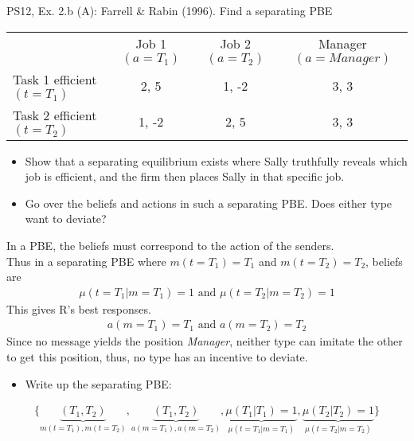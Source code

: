 \begin{frame}{PS12, Ex. 2.b (A): Farrell \& Rabin (1996). Find a separating PBE}
    \begin{table}
      \begin{tabular}{l|c|c|c|}
          \multicolumn{1}{c}{} & \multicolumn{1}{c}{Job 1 $(a=T_1)$} & \multicolumn{1}{c}{Job 2 $(a=T_2)$} & \multicolumn{1}{c}{Manager $(a=Manager)$} \\\cline{2-4}
           Task 1 efficient $(t=T_1)$ & 2, 5 & 1, -2 & 3, 3 \\\cline{2-4}
           Task 2 efficient $(t=T_2)$ & 1, -2 & 2, 5 & 3, 3 \\\cline{2-4}
      \end{tabular}
    \end{table}\vspace{-6pt}
    \begin{itemize}
      \item[(b)] Show that a separating equilibrium exists where Sally truthfully reveals which job is efficient, and the firm then places Sally in that specific job.
      \item[Step 1:] Go over the beliefs and actions in such a separating PBE. Does either type want to deviate?
    \end{itemize}\vspace{-6pt}
    In a PBE, the beliefs must correspond to the action of the senders.\\
    Thus in a separating PBE where $m(t=T_1)=T_1$ and $m(t=T_2)=T_2$, beliefs are\vspace{-2pt}
    \begin{align*}
      \mu(t=T_1|m=T_1)=1\text{ and }\mu(t=T_2|m=T_2)=1
    \end{align*}
    This gives R's best responses.
    \vspace{-2pt}
    \begin{align*}
      a(m=T_1)=T_1\text{ and }a(m=T_2)=T_2
    \end{align*}
    Since no message yields the position \textit{Manager}, neither type can imitate the other to get this position, thus, no type has an incentive to deviate.\vspace{-6pt}
    \begin{itemize}
      \item[Step 2:] Write up the separating PBE:
    \end{itemize}\vspace{-6pt}
    \begin{align*}
      \{\underbrace{(T_1,T_2)}_{m(t=T_1),m(t=T_2)},\underbrace{(T_1,T_2)}_{a(m=T_1),a(m=T_2)},\underbrace{\mu(T_1|T_1)=1}_{\mu(t=T_1|m=T_1)},\underbrace{\mu(T_2|T_2)=1}_{\mu(t=T_2|m=T_2)}\}
    \end{align*}
    \vfill\null
\end{frame}


